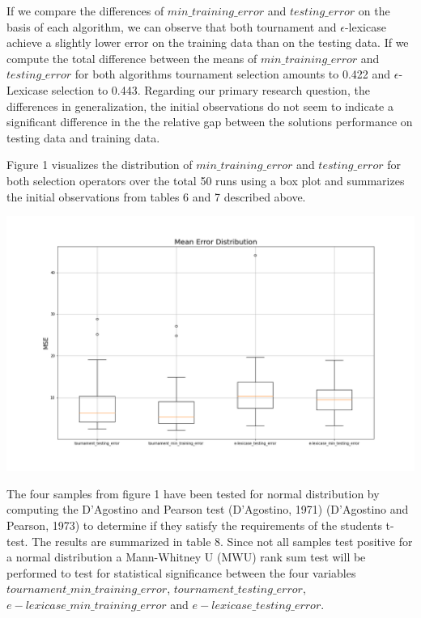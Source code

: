 \documentclass[
  12pt,
]{article}
\let\origfigure\figure
\let\endorigfigure\endfigure
\renewenvironment{figure}[1][2] {
    \expandafter\origfigure\expandafter[H]
} {
    \endorigfigure
}
\begin{document}
If we compare the differences of \(min\_training\_error\) and
\(testing\_error\) on the basis of each algorithm, we can observe that
both tournament and \(\epsilon\)-lexicase achieve a slightly lower error
on the training data than on the testing data. If we compute the total
difference between the means of \(min\_training\_error\) and
\(testing\_error\) for both algorithms tournament selection amounts to
0.422 and \(\epsilon\)-Lexicase selection to 0.443. Regarding our
primary research question, the differences in generalization, the
initial observations do not seem to indicate a significant difference in
the the relative gap between the solutions performance on testing data
and training data.

Figure 1 visualizes the distribution of \(min\_training\_error\) and
\(testing\_error\) for both selection operators over the total 50 runs
using a box plot and summarizes the initial observations from tables 6
and 7 described above.

\begin{figure}
\centering
\includegraphics{./plots/mean_error_boxplot_all.png}
\caption{Distribution of Errors}
\end{figure}

The four samples from figure 1 have been tested for normal distribution
by computing the D'Agostino and Pearson test (D'Agostino, 1971)
(D'Agostino and Pearson, 1973) to determine if they satisfy the
requirements of the students t-test. The results are summarized in table
8. Since not all samples test positive for a normal distribution a
Mann-Whitney U (MWU) rank sum test will be performed to test for
statistical significance between the four variables
\(tournament\_min\_training\_error\), \(tournament\_testing\_error\),
\(e-lexicase\_min\_training\_error\) and \(e-lexicase\_testing\_error\).
\end{document}
